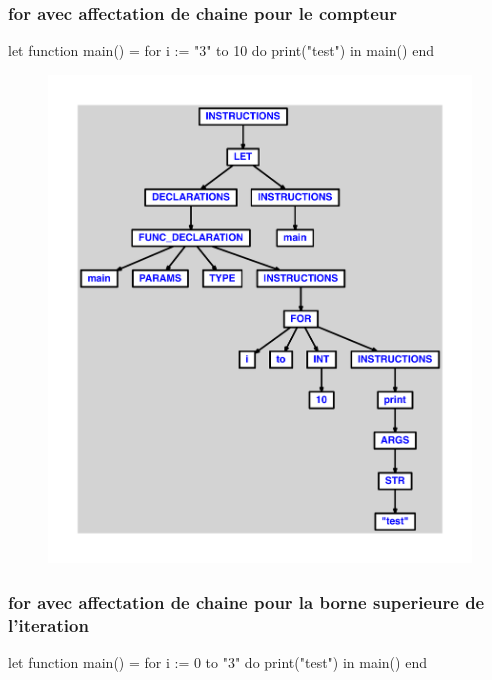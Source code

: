 \documentclass{article}
\begin{document}
\subsubsection{for avec affectation de chaine pour le compteur}
\begin{verbatimtab}
let
	function main() =
		for i := "3" to 10 do
			print("test")
in main() end
\end{verbatimtab}
\begin{figure}[H]\centering\includegraphics[max width=\textwidth]{ast/ast_183.pdf}\end{figure}\subsubsection{for avec affectation de chaine pour la borne superieure de l'iteration}
\begin{verbatimtab}
let
	function main() =
		for i := 0 to "3" do
			print("test")
in main() end
\end{verbatimtab}
\end{document}
